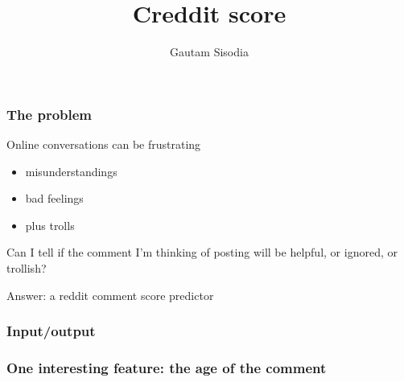 \documentclass{beamer}
\title[Creddit score]{Creddit score}
\author[Sisodia]{Gautam Sisodia}
\begin{document}
\begin{frame}
\titlepage

\end{frame}


\begin{frame}
\frametitle{The problem}

Online conversations can be frustrating

\pause

\begin{itemize}
\item misunderstandings
\pause
\item bad feelings
\pause
\item plus trolls
\end{itemize}

\pause

\hfil

Can I tell if the comment I'm thinking of posting will be helpful, or ignored, or trollish?

\pause

\hfil

Answer: a reddit comment score predictor

\end{frame}

\begin{frame}
\frametitle{Input/output}

\begin{figure}[h]
\centering
{}
\end{figure}


\end{frame}

\begin{frame}
\frametitle{One interesting feature: the age of the comment}

\begin{figure}[h]
\centering
{}
\end{figure}


\end{frame}
\end{document}
